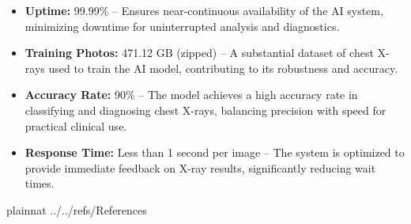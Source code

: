 \documentclass[12pt]{article}
\begin{document}
\begin{itemize}
    \item \textbf{Uptime:} 99.99\% – Ensures near-continuous availability of the AI system, minimizing downtime for uninterrupted analysis and diagnostics.
    \item \textbf{Training Photos:} 471.12 GB (zipped) – A substantial dataset of chest X-rays used to train the AI model, contributing to its robustness and accuracy.
    \item \textbf{Accuracy Rate:} 90\% – The model achieves a high accuracy rate in classifying and diagnosing chest X-rays, balancing precision with speed for practical clinical use.
    \item \textbf{Response Time:} Less than 1 second per image – The system is optimized to provide immediate feedback on X-ray results, significantly reducing wait times.
\end{itemize}

\newpage

 {plainnat}
 {../../refs/References}

\newpage

\noindent {}

\noindent {}
\end{document}
